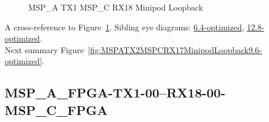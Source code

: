\begin{figure}[h]
\begin{subfigure}{0.33\textwidth}
\hyperref[sec:MSPAFPGATX106RX1806MSPCFPGA9.6-optimized]{}
\end{subfigure}\hspace*{\fill}
\begin{subfigure}{0.33\textwidth}
\hyperref[sec:MSPAFPGATX107RX1807MSPCFPGA9.6-optimized]{}
\end{subfigure}\hspace*{\fill}
\begin{subfigure}{0.33\textwidth}
\hyperref[sec:MSPAFPGATX108RX1808MSPCFPGA9.6-optimized]{}
\end{subfigure}

\begin{subfigure}{0.33\textwidth}
\hyperref[sec:MSPAFPGATX109RX1809MSPCFPGA9.6-optimized]{}
\end{subfigure}\hspace*{\fill}
\begin{subfigure}{0.33\textwidth}
\hyperref[sec:MSPAFPGATX110RX1810MSPCFPGA9.6-optimized]{}
\end{subfigure}\hspace*{\fill}
\begin{subfigure}{0.33\textwidth}
\hyperref[sec:MSPAFPGATX111RX1811MSPCFPGA9.6-optimized]{}
\end{subfigure}

\caption{MSP\_A TX1 MSP\_C RX18 Minipod Loopback} \label{fig:MSPATX1MSPCRX18MinipodLoopback9.6-optimized}
\end{figure}

A cross-reference to Figure~\ref{fig:MSPATX1MSPCRX18MinipodLoopback9.6-optimized}.
Sibling eye diagrams: \hyperref[sec:MSPATX1MSPCRX18MinipodLoopback6.4-optimized]{6.4-optimized}, \hyperref[sec:MSPATX1MSPCRX18MinipodLoopback12.8-optimized]{12.8-optimized}. \\
Next summary Figure~\ref{fig:MSPATX2MSPCRX17MinipodLoopback9.6-optimized}.
\clearpage
% 
\subsection{MSP\_A\_FPGA-TX1-00--RX18-00-MSP\_C\_FPGA}\label{sec:MSPAFPGATX100RX1800MSPCFPGA9.6-optimized}

